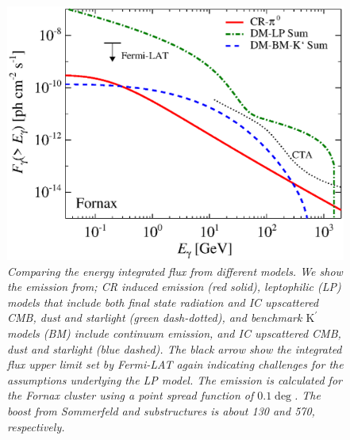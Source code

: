 \documentclass[10pt,aps,pra,reprint,amsmath,amsfonts,amssymb,showpacs,nofootinbib,floatfix]{revtex4-1}
\newcommand{\rmn}{\mathrm}
\newcommand{\Kp}{\rmn{K}^\prime}
\begin{document}
\begin{figure}
 \includegraphics[width=0.99\columnwidth]{figures/flux.int.v11.0.1deg.1.6T.SubMass.SF300.IR2.noMW.woGal.eps}
 \caption{\it Comparing the energy integrated flux from different
   models. We show the emission from; CR induced emission (red
   solid), leptophilic (LP) models that include both final state
   radiation and IC upscattered CMB, dust and starlight (green
   dash-dotted), and benchmark $\Kp$ models (BM) include continuum
   emission, and IC upscattered CMB, dust and starlight (blue
   dashed). The black arrow show the integrated flux upper limit set
   by Fermi-LAT again indicating challenges for the assumptions
   underlying the LP model. The emission is calculated for the Fornax
   cluster using a point spread function of $0.1\deg$. The boost from
   Sommerfeld and substructures is about 130 and 570, respectively. }
 \label{fig:flux_int}
\end{figure}
\end{document}
